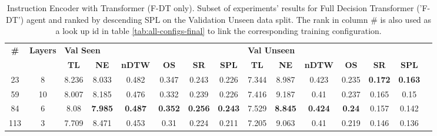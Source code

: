 \begin{table}
\centering
\caption{\label{tab:f_dt_instruction_encoding_full}Instruction Encoder with Transformer (F-DT only). Subset of experiments' results for Full Decision Transformer ('F-DT') agent and ranked by descending SPL on the Validation Unseen data split. The rank in column \# is also used as a look up id in table \ref{tab:all-configs-final} to link the corresponding training configuration.}
\begin{tabular}{@{\hskip3pt}c@{\hskip3pt}c@{\hskip3pt}c@{\hskip3pt}c@{\hskip3pt}c@{\hskip3pt}c@{\hskip3pt}c@{\hskip3pt}c@{\hskip3pt}c@{\hskip3pt}c@{\hskip3pt}c@{\hskip3pt}c@{\hskip3pt}c@{\hskip3pt}c@{\hskip3pt}c}
\toprule
\textbf{\#} & \textbf{Layers} & \multicolumn{6}{l}{\textbf{Val Seen}} & \multicolumn{6}{l}{\textbf{Val Unseen}} \\
 \textbf{~} &      \textbf{~} &       \textbf{TL} &     \textbf{NE} &   \textbf{nDTW} &     \textbf{OS} &     \textbf{SR} &    \textbf{SPL} &         \textbf{TL} &     \textbf{NE} &   \textbf{nDTW} &    \textbf{OS} &     \textbf{SR} &    \textbf{SPL} \\
\midrule
         23 &               8 &             8.236 &           8.033 &           0.482 &           0.347 &           0.243 &           0.226 &               7.344 &           8.987 &           0.423 &          0.235 &  \textbf{0.172} &  \textbf{0.163} \\
         59 &              10 &             8.007 &           8.185 &           0.476 &           0.332 &           0.239 &           0.226 &               7.416 &           9.187 &            0.41 &          0.237 &           0.165 &            0.15 \\
         84 &               6 &              8.08 &  \textbf{7.985} &  \textbf{0.487} &  \textbf{0.352} &  \textbf{0.256} &  \textbf{0.243} &               7.529 &  \textbf{8.845} &  \textbf{0.424} &  \textbf{0.24} &           0.157 &           0.142 \\
        113 &               3 &             7.709 &           8.471 &           0.453 &            0.31 &           0.224 &           0.211 &               7.205 &           9.063 &            0.41 &          0.219 &           0.146 &           0.136 \\
\bottomrule
\end{tabular}
\end{table}
